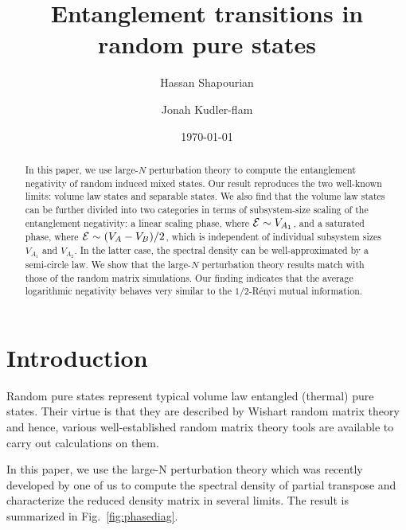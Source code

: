 \documentclass[aps,pra,groupedaddress,twocolumn,notitlepage,superscriptaddress,10pt]{revtex4-1}
\begin{document}
\title{Entanglement transitions in random pure states}
\author{Hassan Shapourian%
  }
\author{Jonah Kudler-flam%
}


\date{\today}

\begin{abstract}
In this paper, we use large-$N$ perturbation theory to compute the entanglement negativity of random induced mixed states. Our result reproduces the two well-known limits: volume law states and separable states. We also find that the volume law states can be further divided into two categories in terms of subsystem-size scaling  of the entanglement  negativity: a linear scaling phase, where ${\cal E}\sim V_{A_1}$, and a saturated phase, where ${\cal E}\sim (V_{A}-V_B)/2$, which  is independent of individual subsystem sizes $V_{A_1}$ and $V_{A_2}$. In the latter case, the spectral density can be well-approximated by a semi-circle law. We show that the large-$N$ perturbation theory results match with those of the random matrix simulations.
Our finding indicates that the average logarithmic negativity behaves very similar to the $1/2$-R\'enyi mutual information.
\end{abstract}

\maketitle

\section{Introduction}

Random pure states represent typical volume law entangled  (thermal) pure states. Their virtue is that they are described by Wishart random matrix theory and hence, various well-established random matrix theory tools are available to carry out calculations on them.

In this paper, we use the large-N perturbation theory which was recently developed by one of us to compute the spectral density of partial transpose and characterize the reduced density matrix in several limits. The result is summarized in Fig.~\ref{fig:phasediag}.
\end{document}
